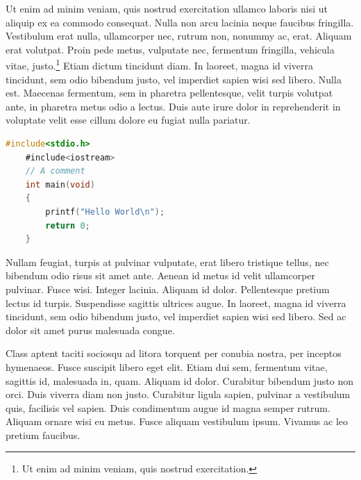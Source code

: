 Ut enim ad minim veniam, quis nostrud exercitation ullamco laboris nisi ut aliquip ex ea commodo consequat. Nulla non arcu lacinia neque faucibus fringilla. Vestibulum erat nulla, ullamcorper nec, rutrum non, nonummy ac, erat. Aliquam erat volutpat. Proin pede metus, vulputate nec, fermentum fringilla, vehicula vitae, justo.\footnote{Ut enim ad minim veniam, quis nostrud exercitation.} Etiam dictum tincidunt diam. In laoreet, magna id viverra tincidunt, sem odio bibendum justo, vel imperdiet sapien wisi sed libero. Nulla est. Maecenas fermentum, sem in pharetra pellentesque, velit turpis volutpat ante, in pharetra metus odio a lectus. Duis aute irure dolor in reprehenderit in voluptate velit esse cillum dolore eu fugiat nulla pariatur. 

\begin{lstlisting}[caption={Zbytečný kód},label=list:8-6,captionpos=b,float,abovecaptionskip=-\medskipamount,abovecaptionskip=\medskipamount,language=C]
    #include<stdio.h>
    #include<iostream>
    // A comment
    int main(void)
    {
        printf("Hello World\n");
        return 0;
    }
\end{lstlisting}

Nullam feugiat, turpis at pulvinar vulputate, erat libero tristique tellus, nec bibendum odio risus sit amet ante. Aenean id metus id velit ullamcorper pulvinar. Fusce wisi. Integer lacinia. Aliquam id dolor. Pellentesque pretium lectus id turpis. Suspendisse sagittis ultrices augue. In laoreet, magna id viverra tincidunt, sem odio bibendum justo, vel imperdiet sapien wisi sed libero. Sed ac dolor sit amet purus malesuada congue.~\cite{Crochemore2002}

Class aptent taciti sociosqu ad litora torquent per conubia nostra, per inceptos hymenaeos. Fusce suscipit libero eget elit. Etiam dui sem, fermentum vitae, sagittis id, malesuada in, quam. Aliquam id dolor. Curabitur bibendum justo non orci. Duis viverra diam non justo. Curabitur ligula sapien, pulvinar a vestibulum quis, facilisis vel sapien. Duis condimentum augue id magna semper rutrum. Aliquam ornare wisi eu metus. Fusce aliquam vestibulum ipsum. Vivamus ac leo pretium faucibus.~\cite{Motwani2014}

